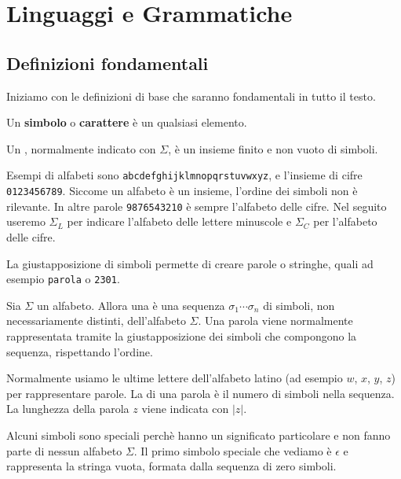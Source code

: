 \setchapterpreamble[u]{\margintoc}
\chapter{Linguaggi e Grammatiche}




\section{Definizioni fondamentali}

Iniziamo con le definizioni di base che saranno fondamentali in tutto il testo.

Un \textbf{simbolo} o \textbf{carattere} è un qualsiasi elemento.


\begin{definition}[Alfabeto]\label{def:alfabeto}
Un , normalmente indicato con $\Sigma$, è un insieme finito e non vuoto di simboli.
\end{definition}

Esempi di alfabeti sono \texttt{abcdefghijklmnopqrstuvwxyz}, e l'insieme di cifre \texttt{0123456789}.
Siccome un alfabeto è un insieme, l'ordine dei simboli non è rilevante.
In altre parole \texttt{9876543210} è sempre l'alfabeto delle cifre.
Nel seguito useremo $\Sigma_{L}$ per indicare l'alfabeto delle lettere minuscole e
$\Sigma_{C}$ per l'alfabeto delle cifre.


La giustapposizione di simboli permette di creare parole o stringhe, quali ad
esempio \texttt{parola} o \texttt{2301}.

\begin{definition}[Parola]\label{def:parola}
Sia $\Sigma$ un alfabeto.
Allora una  è una sequenza $\sigma_{1}\cdots\sigma_{n}$ di simboli, non necessariamente
distinti, dell'alfabeto $\Sigma$.
Una parola viene normalmente rappresentata tramite la giustapposizione dei
simboli che compongono la sequenza, rispettando l'ordine.
\end{definition}

Normalmente usiamo le ultime lettere dell'alfabeto latino (ad esempio $w$, $x$,
$y$, $z$) per rappresentare parole.
La  di una parola è il numero di simboli nella sequenza.
La lunghezza della parola $z$ viene indicata con $|z|$.

Alcuni simboli sono speciali perchè hanno un significato particolare e non fanno parte di nessun alfabeto $\Sigma$.
Il primo simbolo speciale che vediamo è $\epsilon$ e rappresenta la stringa vuota,
formata dalla sequenza di zero simboli.

